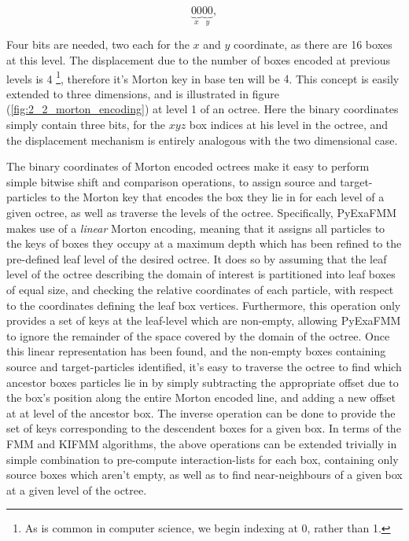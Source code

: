  \begin{equation}
    \underbrace{00}_{x}\underbrace{00}_{y},
\end{equation}

Four bits are needed, two each for the $x$ and $y$ coordinate, as there are 16
 boxes at this level. The displacement due to the number of boxes encoded at
 previous levels is 4 \footnote{As is common in computer science, we begin indexing at 0, rather than 1.},
therefore it's Morton \gls{key} in base ten will be $4$. This concept is easily
extended to three dimensions, and is illustrated in
figure (\ref{fig:2_2_morton_encoding}) at level 1 of an octree. Here the binary
coordinates simply contain three bits, for the $xyz$ box indices
at his level in the octree, and the displacement mechanism is entirely analogous with the
two dimensional case.

The binary coordinates of Morton encoded octrees make it easy to perform simple
bitwise shift and comparison operations, to assign source and \gls{target-particles} to the Morton key
that encodes the box they lie in for each level of a given octree, as well as traverse the levels of
the octree. Specifically, \gls{PyExaFMM} makes use of a \textit{linear} Morton encoding, meaning that it assigns
all particles to the keys of boxes they occupy at a maximum depth which has been refined to the
pre-defined leaf level of the desired octree. It does so by assuming that the
leaf level of the octree describing the domain of interest is partitioned into leaf boxes of
equal size, and checking the relative coordinates of each particle, with respect to the coordinates defining
the leaf box vertices. Furthermore, this operation only provides
a set of keys at the leaf-level which are non-empty, allowing \gls{PyExaFMM} to
ignore the remainder of the space covered by the domain of the octree. Once this
linear representation has been found, and the non-empty boxes containing
source and \gls{target-particles} identified, it's easy to traverse the octree
to find which ancestor boxes particles lie in by simply subtracting the appropriate
offset due to the box's position along the entire Morton encoded line, and adding a new offset at
at level of the ancestor box. The inverse operation can be done to provide the set
of keys corresponding to the descendent boxes for a given box. In terms of the
\gls{FMM} and \gls{KIFMM} algorithms, the above operations can be extended trivially
in simple combination to pre-compute \gls{interaction-list}s for each box, containing
only source boxes which aren't empty, as well as to find \gls{near-neighbours} of
a given box at a given level of the octree.

